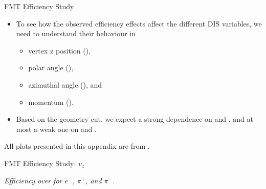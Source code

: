 \begin{frame}{FMT Efficiency Study}
    \label{20.04::fmt_efficiency_study}
    \begin{itemize}
        \item
            To see how the observed efficiency effects affect the different DIS variables, we need to understand their behaviour in

            \vspace{6pt}
            \begin{itemize}
                \item
                    vertex z position (),

                \item
                    polar angle (\ef{$\theta$}),

                \item
                    azimuthal angle (\ef{$\varphi$}), and

                \item
                    momentum ().
            \end{itemize}

        \vspace{12pt}
        \item
            Based on the geometry cut, we expect a strong dependence on  and \ef{$\theta$}, and at most a weak one on \ef{$\varphi$} and .
    \end{itemize}

    \vspace{12pt}
    \ef{*}All plots presented in this appendix are from .

\end{frame}

\begin{frame}{FMT Efficiency Study: $v_z$}
    \begin{center}
        \vspace{-6pt}
        \begin{figure}[t]
        \end{figure}
        \scriptsize{\textit{Efficiency over  for $e^-$, $\pi^+$, and $\pi^-$.}}
    \end{center}

\end{frame}

